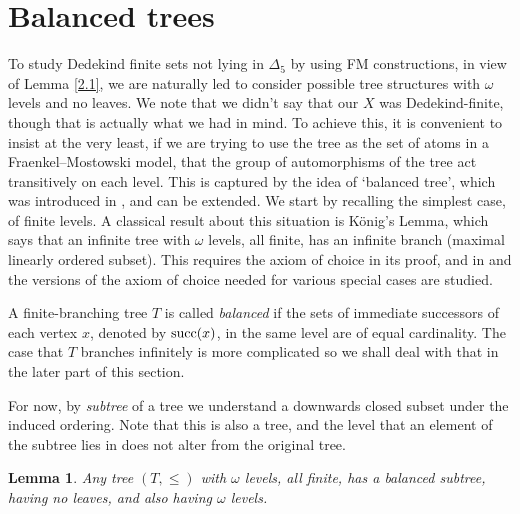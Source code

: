 \documentclass[a4paper,reqno]{amsart}
\numberwithin{equation}{section}
\newtheorem{lemma}[theorem]{Lemma}
\begin{document}
\section{Balanced trees}

To study Dedekind finite sets not lying in $\Delta_5$ by using FM constructions, in view of Lemma \ref{2.1}, 
we are naturally led to consider possible tree structures with $\omega$ levels and no leaves. We note that 
we didn't say that our $X$ was Dedekind-finite, though that is actually what we had in mind. To achieve this, 
it is convenient to insist at the very least, if we are trying to use the tree as the set of atoms in a 
Fraenkel--Mostowski model, that the group of automorphisms of the tree act transitively on each level. This 
is captured by the idea of `balanced tree', which was introduced in \cite{Forster}, and can be extended. We 
start by recalling the simplest case, of finite levels. A classical result about this situation is K\"onig's 
Lemma, which says that an infinite tree with $\omega$ levels, all finite, has an infinite branch (maximal 
linearly ordered subset). This requires the axiom of choice in its proof, and in \cite{Forster} and 
\cite{Truss2} the versions of the axiom of choice needed for various special cases are studied. 
   
A finite-branching tree $T$ is called {\em balanced} if the sets of immediate successors of each vertex 
$x$, denoted by ${\rm succ}(x)$, in the same level are of equal cardinality.  The case that $T$ branches 
infinitely is more complicated so we shall deal with that in the later part of this section.

For now, by {\em subtree} of a tree we understand a downwards closed subset under the induced 
ordering. Note that this is also a tree, and the level that an element of the subtree lies in does 
not alter from the original tree.

\begin{lemma} Any tree $(T, \le)$ with $\omega$ levels, all finite, has a balanced subtree, having no leaves,
and also having $\omega$ levels. \label{4.1}  \end{lemma}
\end{document}
